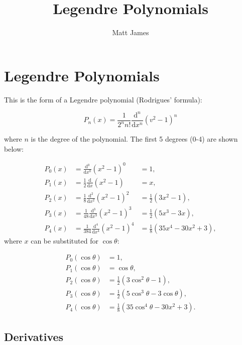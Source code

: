 \documentclass[]{article}
\title{Legendre Polynomials}
\author{Matt James}
\begin{document}
\maketitle


\section{Legendre Polynomials}

	This is the form of a Legendre polynomial (Rodrigues' formula):
	
	\begin{equation}
		P_n(x) = \frac{1}{2^n n!}\frac{\text{d}^n}{\text{d}x^n}(v^2 - 1)^n
	\end{equation}

	where $n$ is the degree of the polynomial. The first 5 degrees (0-4) are shown below:
	
	\begin{align}
		P_0(x) &= \frac{\text{d}^0}{\text{d}x^0} (x^2 - 1)^0 &= 1, \label{EqP0} \\
		P_1(x) &= \frac{1}{2} \frac{\text{d}}{\text{d}x} (x^2 - 1) &= x, \label{EqP1} \\
		P_2(x) &= \frac{1}{8} \frac{\text{d}^2}{\text{d}x^2} (x^2 - 1)^2 &= \frac{1}{2}(3x^2 - 1), \label{EqP2} \\
		P_3(x) &= \frac{1}{48} \frac{\text{d}^3}{\text{d}x^3} (x^2 - 1)^3 &= \frac{1}{2}(5x^3 - 3x), \label{EqP3} \\
		P_4(x) &= \frac{1}{384} \frac{\text{d}^4}{\text{d}x^4} (x^2 - 1)^4 &= \frac{1}{8}(35x^4 - 30x^2 + 3), \label{EqP4}
	\end{align}
	where $x$ can be substituted for $\cos{\theta}$:
	
	\begin{align}
		P_0(\cos{\theta}) &= 1 \label{EqP0t}, \\
		P_1(\cos{\theta}) &= \cos{\theta}, \label{EqP1t} \\
		P_2(\cos{\theta}) &= \frac{1}{2}(3\cos^2{\theta} - 1 \label{EqP2t}), \\
		P_3(\cos{\theta}) &= \frac{1}{2}(5\cos^3{\theta} - 3\cos{\theta}), \label{EqP3t} \\
		P_4(\cos{\theta}) &= \frac{1}{8}(35\cos^4{\theta} - 30x^2 + 3). \label{EqP4t}		
	\end{align}
	
	\subsection{Derivatives}
		
\end{document}
